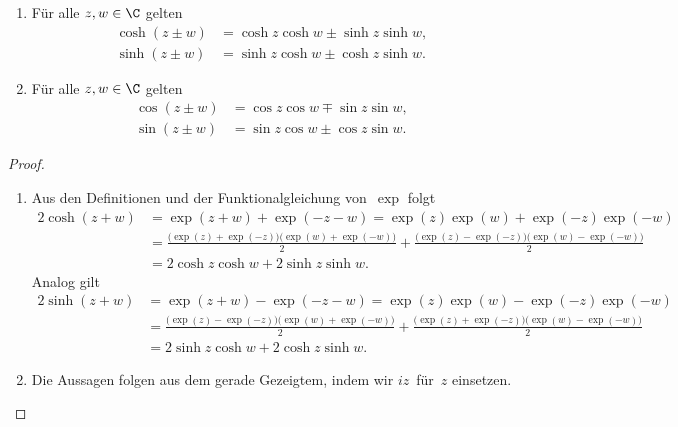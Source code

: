 \documentclass[a4paper]{article}
\begin{document}

\begin{theorem}\leavevmode
    \begin{enumerate}
        \item Für alle $z,w \in \C$ gelten
              \begin{align*}
                  \cosh(z\pm w) & = \cosh z\cosh w \pm \sinh z\sinh w, \\
                  \sinh(z\pm w) & = \sinh z\cosh w \pm \cosh z\sinh w.
              \end{align*}
        \item Für alle $z,w \in \C$ gelten
              \begin{align*}
                  \cos(z\pm w) & = \cos z\cos w \mp \sin z\sin w, \\
                  \sin(z\pm w) & = \sin z\cos w \pm \cos z\sin w.
              \end{align*}\label{cor:addition:cos}
    \end{enumerate}
\end{theorem}

\begin{proof}\leavevmode
    \begin{enumerate}
        \item Aus den Definitionen und der Funktionalgleichung von~$\exp$ folgt
              \begin{align*}
                  2\cosh(z+w) & = \exp(z+w)+\exp(-z-w) = \exp(z)\exp(w) + \exp(-z)\exp(-w)                                                                          \\
                              & = \frac{\big(\exp(z)+\exp(-z)\big) \big(\exp(w)+\exp(-w)\big)}{2} + \frac{\big(\exp(z)-\exp(-z)\big) \big(\exp(w)-\exp(-w)\big)}{2} \\
                              & = 2\cosh z\cosh w + 2\sinh z\sinh w.
              \end{align*}
              Analog gilt
              \begin{align*}
                  2\sinh(z+w) & = \exp(z+w)-\exp(-z-w) = \exp(z)\exp(w) - \exp(-z)\exp(-w)                                                                          \\
                              & = \frac{\big(\exp(z)-\exp(-z)\big) \big(\exp(w)+\exp(-w)\big)}{2} + \frac{\big(\exp(z)+\exp(-z)\big) \big(\exp(w)-\exp(-w)\big)}{2} \\
                              & = 2\sinh z\cosh w + 2\cosh z\sinh w.
              \end{align*}
        \item Die Aussagen folgen aus dem gerade Gezeigtem, indem wir $iz$~für~$z$ einsetzen.\qedhere
    \end{enumerate}
\end{proof}
\end{document}
